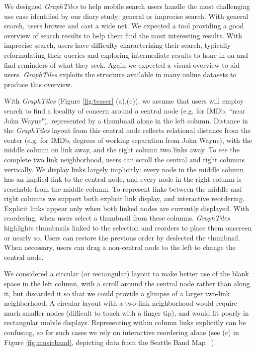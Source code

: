 We designed \textit{GraphTiles} to help mobile search users handle the most challenging use case identified by our diary study: general or imprecise search. With general search, users browse and cast a wide net. We expected a tool providing a good overview of search results to help them find the most interesting results. With imprecise search, users have difficulty characterizing their search, typically reformulating their queries and exploring intermediate results to hone in on and find reminders of what they seek. Again we expected a visual overview to aid users. \textit{GraphTiles} exploits the structure available in many online datasets to produce this overview. 

With \textit{GraphTiles} (Figure \ref{fig:teaser} (a),(c)), we assume that users will employ search to find a locality of concern around a central node (e.g. for IMDb, ``near John Wayne"), represented by a thumbnail alone in the left column. Distance in the \textit{GraphTiles} layout from this central node reflects relational distance from the center (e.g. for IMDb, degrees of working separation from John Wayne), with the middle column on link away, and the right column two links away. To see the complete two link neighborhood, users can scroll the central and right columns vertically. We display links largely implicitly: every node in the middle column has an implied link to the central node, and every node in the right column is reachable from the middle column. To represent links between the middle and right columns we support both explicit link display, and interactive reordering. Explicit links appear only when both linked nodes are currently displayed. With reordering, when users select a thumbnail from these columns, \textit{GraphTiles} highlights thumbnails linked to the selection and reorders to place them onscreen or nearly so. Users can restore the previous order by deslected the thumbnail. When necessary, users can drag a non-central node to the left to change the central node.

We considered a circular (or rectangular) layout to make better use of the blank space in the left column, with a scroll around the central node rather than along it, but discarded it so that we could provide a glimpse of a larger two-link neighborhood. A circular layout with a two-link neighborhood would require much smaller nodes (difficult to touch with a finger tip), and would fit poorly in rectangular mobile displays. Representing within column links explicitly can be confusing, so for such cases we rely on interactive reordering alone (see (c) in Figure \ref{fig:musicband}, depicting data from the Seattle Band Map ~\cite{seattleband}).